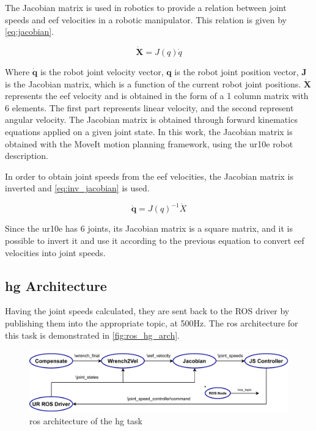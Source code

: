 \par The Jacobian matrix is used in robotics to provide a relation between joint speeds and \ac{eef} velocities in a robotic manipulator. This relation is given by \autoref{eq:jacobian}.

\begin{equation}
    \dot{\mathbf{X}} = J(q)\dot{q}
    \label{eq:jacobian}
\end{equation}

\noindent Where $\dot{\mathbf{q}}$ is the robot joint velocity vector, $\mathbf{q}$ is the robot joint position vector, $\mathbf{J}$ is the Jacobian matrix, which is a function of the current robot joint positions. $\dot{\mathbf{X}}$ represents the \ac{eef} velocity and is obtained in the form of a 1 column matrix with 6 elements. The first part represents linear velocity, and the second represent angular velocity. The Jacobian matrix is obtained through forward kinematics equations applied on a given joint state. In this work, the Jacobian matrix is obtained with the MoveIt motion planning framework, using the \ac{ur10e} robot description. 

\par In order to obtain joint speeds from the \ac{eef} velocities, the Jacobian matrix is inverted and \autoref{eq:inv_jacobian} is used.

\begin{equation}
    \dot{\mathbf{q}} = J(q)^{-1} \dot{X}
    \label{eq:inv_jacobian}
\end{equation}

\noindent Since the \ac{ur10e} has 6 joints, its Jacobian matrix is a square matrix, and it is possible to invert it and use it according to the previous equation to convert \ac{eef} velocities into joint speeds.



\subsection{\ac{hg} Architecture}

\par Having the joint speeds calculated, they are sent back to the ROS driver by publishing them into the appropriate topic, at 500Hz. The \ac{ros} architecture for this task is demonstrated in \autoref{fig:ros_hg_arch}.

\begin{figure}[h]
    \centering
    \includegraphics[width=\linewidth]{figs/chp5/ros_hg_arch.pdf}
    \caption{\ac{ros} architecture of the \ac{hg} task}
    \label{fig:ros_hg_arch}
\end{figure}

